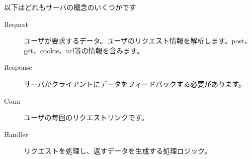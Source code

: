 以下はどれもサーバの概念のいくつかです

\begin{description}
  \item[Request] ユーザが要求するデータ。ユーザのリクエスト情報を解析します。post、get、cookie、url等の情報を含みます。
  \item[Response] サーバがクライアントにデータをフィードバックする必要があります。
  \item[Conn] ユーザの毎回のリクエストリンクです。
  \item[Handler] リクエストを処理し、返すデータを生成する処理ロジック。
\end{description}
